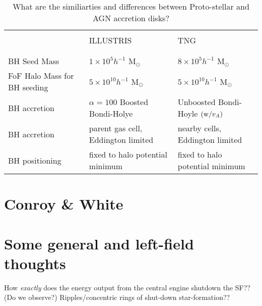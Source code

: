 \documentclass[11pt,a4paper]{article}
\begin{document}
\begin{landscape}
  \begin{table}[]
    \centering
    \label{my-label}
    \begin{tabular}{  p{65mm}   p{70mm}  p{70mm} }  %
      \hline
      \hline
      &                    &  \\
      & ILLUSTRIS    & TNG \\
                  &                     &  \\
      \hline
                  &                     &  \\
      BH Seed Mass                             &  $1\times10^{5} h^{-1}$ M$_{\odot}$ &   $8\times10^{5} h^{-1}$ M$_{\odot}$\\
      FoF Halo Mass for BH seeding    & $5\times10^{10} h^{-1}$ M$_{\odot}$ &   $5\times10^{10} h^{-1}$ M$_{\odot}$\\
      BH accretion & $\alpha=100$ Boosted Bondi-Holye   & Unboosted Bondi-Hoyle $({\rm w} / v_{A})$  \\
      BH accretion & parent gas cell, Eddington limited & nearby cells, Eddington limited  \\
      BH positioning & fixed to halo potential minimum & fixed to halo potential minimum \\
    \hline
    \hline
\end{tabular}
    \caption{What are the similiarties and differences between 
      Proto-stellar and AGN accretion disks?
    }
    \label{BH Feedback: BH seeding and accretion.  
BHs are usually placed by hand as``sink particles'':
they can grow in mass by `accreting' material from the surroundings
(Pillepich Edinburgh talk, 20171011).   }
\end{table}
\end{landscape}



\section{Conroy \& White}


\section{Some general and left-field thoughts}
How {\it exactly} does the energy output from the central engine shutdown the SF?? \\
(Do we observe?) Ripples/concentric rings of shut-down star-formation??\\
\end{document}
